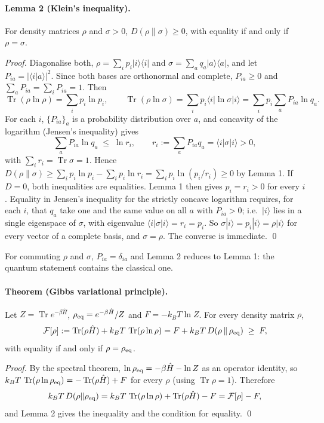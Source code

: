 \documentclass[10pt,a4paper]{article}
\theoremstyle{remark}
\newcommand{\Tr}{\operatorname{Tr}}
\begin{document}
\paragraph{Lemma 2 (Klein's inequality).} For density matrices $ \rho $ and
$ \sigma > 0 $, $ D(\rho\|\sigma) \geq 0 $, with equality if and only if $ \rho = \sigma $.

\emph{Proof.} Diagonalise both, $ \rho = \sum_ip_i|i\rangle\langle i| $ and
$ \sigma = \sum_aq_a|a\rangle\langle a| $, and let $ P_{ia} = |\langle i|a\rangle|^{2} $. Since
both bases are orthonormal and complete, $ P_{ia} \geq 0 $ and
$ \sum_aP_{ia} = \sum_iP_{ia} = 1 $. Then
\[
  \Tr(\rho\ln\rho) = \sum_ip_i\ln p_i ,
  \qquad
  \Tr(\rho\ln\sigma) = \sum_ip_i\langle i|\ln\sigma|i\rangle = \sum_ip_i\sum_aP_{ia}\ln q_a .
\]
For each $ i $, $ \{P_{ia}\}_a $ is a probability distribution over $ a $, and concavity
of the logarithm (Jensen's inequality) gives
\[
  \sum_aP_{ia}\ln q_a \;\leq\; \ln r_i , \qquad r_i := \sum_aP_{ia}q_a = \langle i|\sigma|i\rangle > 0 ,
\]
with $ \sum_ir_i = \Tr\sigma = 1 $. Hence
$ D(\rho\|\sigma) \geq \sum_ip_i\ln p_i - \sum_ip_i\ln r_i = \sum_ip_i\ln(p_i/r_i) \geq 0 $
by Lemma 1. If $ D = 0 $, both inequalities are equalities. Lemma 1 then gives
$ p_i = r_i > 0 $ for every $ i $. Equality in Jensen's inequality for the strictly
concave logarithm requires, for each $ i $, that $ q_a $ take one and the same value on
all $ a $ with $ P_{ia} > 0 $; i.e.\ $ |i\rangle $ lies in a single eigenspace of $ \sigma $,
with eigenvalue $ \langle i|\sigma|i\rangle = r_i = p_i $. So $ \sigma|i\rangle = p_i|i\rangle = \rho|i\rangle $
for every vector of a complete basis, and $ \sigma = \rho $. The converse is
immediate. \qed

For commuting $ \rho $ and $ \sigma $, $ P_{ia} = \delta_{ia} $ and Lemma 2 reduces to Lemma 1:
the quantum statement contains the classical one.

\paragraph{Theorem (Gibbs variational principle).} Let $ Z = \Tr e^{-\beta\hat H} $,
$ \rho_{\rm eq} = e^{-\beta\hat H}/Z $ and $ F = -k_BT\ln Z $. For every density matrix $ \rho $,
\[
  \mathcal{F}[\rho] := \Tr(\rho\hat H) + k_BT\,\Tr(\rho\ln\rho)
  = F + k_BT\,D(\rho\,\|\,\rho_{\rm eq}) \;\geq\; F ,
\]
with equality if and only if $ \rho = \rho_{\rm eq} $.

\emph{Proof.} By the spectral theorem, $ \ln\rho_{\rm eq} = -\beta\hat H - \ln Z $ as an
operator identity, so $ k_BT\,\Tr(\rho\ln\rho_{\rm eq}) = -\Tr(\rho\hat H) + F $ for every
$ \rho $ (using $ \Tr\rho = 1 $). Therefore
\[
  k_BT\,D(\rho\|\rho_{\rm eq}) = k_BT\,\Tr(\rho\ln\rho) + \Tr(\rho\hat H) - F
  = \mathcal{F}[\rho] - F ,
\]
and Lemma 2 gives the inequality and the condition for equality. \qed
\end{document}
